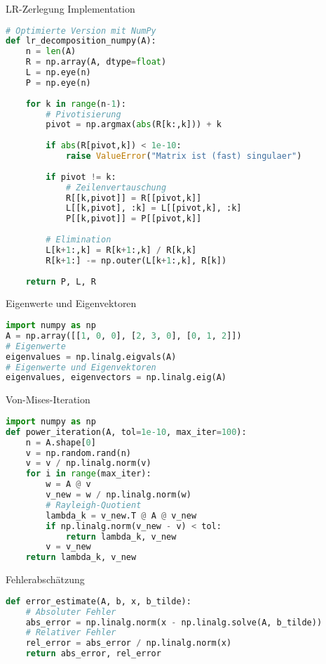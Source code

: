 \begin{examplecode}{LR-Zerlegung Implementation}
\begin{lstlisting}[language=Python, style=basesmol]
# Optimierte Version mit NumPy
def lr_decomposition_numpy(A):
    n = len(A)
    R = np.array(A, dtype=float)
    L = np.eye(n)
    P = np.eye(n)
    
    for k in range(n-1):
        # Pivotisierung
        pivot = np.argmax(abs(R[k:,k])) + k
        
        if abs(R[pivot,k]) < 1e-10:
            raise ValueError("Matrix ist (fast) singulaer")
            
        if pivot != k:
            # Zeilenvertauschung
            R[[k,pivot]] = R[[pivot,k]]
            L[[k,pivot], :k] = L[[pivot,k], :k]
            P[[k,pivot]] = P[[pivot,k]]
            
        # Elimination
        L[k+1:,k] = R[k+1:,k] / R[k,k]
        R[k+1:] -= np.outer(L[k+1:,k], R[k])
        
    return P, L, R
\end{lstlisting}
\end{examplecode}

\begin{examplecode}{Eigenwerte und Eigenvektoren}
\begin{lstlisting}[language=Python, style=basesmol]
import numpy as np
A = np.array([[1, 0, 0], [2, 3, 0], [0, 1, 2]])
# Eigenwerte
eigenvalues = np.linalg.eigvals(A)
# Eigenwerte und Eigenvektoren
eigenvalues, eigenvectors = np.linalg.eig(A)
\end{lstlisting}
\end{examplecode}

\begin{examplecode}{Von-Mises-Iteration}
\begin{lstlisting}[language=Python, style=basesmol]
import numpy as np
def power_iteration(A, tol=1e-10, max_iter=100):
    n = A.shape[0]
    v = np.random.rand(n)
    v = v / np.linalg.norm(v)
    for i in range(max_iter):
        w = A @ v
        v_new = w / np.linalg.norm(w)
        # Rayleigh-Quotient
        lambda_k = v_new.T @ A @ v_new
        if np.linalg.norm(v_new - v) < tol:
            return lambda_k, v_new
        v = v_new
    return lambda_k, v_new
\end{lstlisting}
\end{examplecode}

\begin{examplecode}{Fehlerabschätzung}
\begin{lstlisting}[language=Python, style=basesmol]
def error_estimate(A, b, x, b_tilde):
    # Absoluter Fehler
    abs_error = np.linalg.norm(x - np.linalg.solve(A, b_tilde))
    # Relativer Fehler
    rel_error = abs_error / np.linalg.norm(x)
    return abs_error, rel_error
\end{lstlisting}
\end{examplecode}

